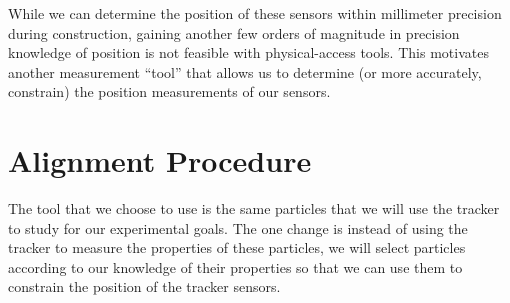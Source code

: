 While we can determine the position of these sensors within millimeter precision
during construction, gaining another few orders of magnitude in precision knowledge
of position is not feasible with physical-access tools.
This motivates another measurement ``tool'' that allows us to determine
(or more accurately, constrain) the position measurements of our sensors.

\section{Alignment Procedure}
The tool that we choose to use is the same particles that we will use the tracker
to study for our experimental goals.
The one change is instead of using the tracker to measure the properties of these particles,
we will select particles according to our knowledge of their properties so that we can use
them to constrain the position of the tracker sensors.
